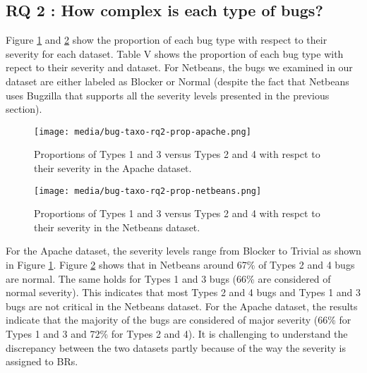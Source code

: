 \noindent{}

\subsection{RQ 2 : How complex is each type of bugs?}

Figure \ref{fig:bug-taxo-rq2-prop-apache} and \ref{fig:bug-taxo-rq2-prop-netbeans} show the proportion of each bug type with
respect to their severity for each dataset. Table V shows the
proportion of each bug type with repect to their severity and
dataset. For Netbeans, the bugs we examined in our dataset
are either labeled as Blocker or Normal (despite the fact that
Netbeans uses Bugzilla that supports all the severity levels
presented in the previous section).

\begin{figure}[h!]
  \centering
    \texttt{[image: media/bug-taxo-rq2-prop-apache.png]}
    \caption{Proportions of Types 1 and 3 versus Types 2 and 4 with respct to their severity in the Apache dataset.
    \label{fig:bug-taxo-rq2-prop-apache}}
\end{figure}

\begin{figure}[h!]
  \centering
    \texttt{[image: media/bug-taxo-rq2-prop-netbeans.png]}
    \caption{Proportions of Types 1 and 3 versus Types 2 and 4 with respct to their severity in the Netbeans dataset.
    \label{fig:bug-taxo-rq2-prop-netbeans}}
\end{figure}

For the Apache dataset, the severity levels range from
Blocker to Trivial as shown in Figure \ref{fig:bug-taxo-rq2-prop-apache}. Figure \ref{fig:bug-taxo-rq2-prop-netbeans} shows that
in Netbeans around 67\% of Types 2 and 4 bugs are normal.
The same holds for Types 1 and 3 bugs (66\% are considered
of normal severity). This indicates that most Types 2 and 4
bugs and Types 1 and 3 bugs are not critical in the Netbeans
dataset. For the Apache dataset, the results indicate that the
majority of the bugs are considered of major severity (66\%
for Types 1 and 3 and 72\% for Types 2 and 4). It is
challenging to understand the discrepancy between the two
datasets partly because of the way the severity is assigned to
BRs.

